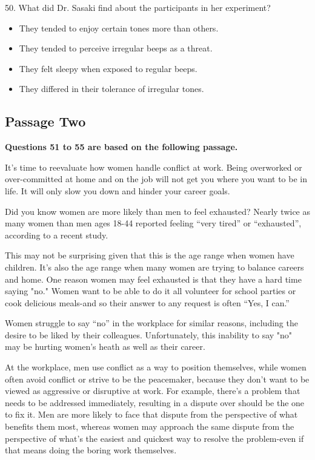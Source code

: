 \documentclass[UTF8,11pt]{ctexart}
\begin{document}
50. What did Dr. Sasaki find about the participants in her experiment?


\begin{itemize}[leftmargin=2em,itemsep=.2em,topsep=.4em]\item[A.] They tended to enjoy certain tones more than others.
\item[B.] They tended to perceive irregular beeps as a threat.
\item[C.] They felt sleepy when exposed to regular beeps.
\item[D.] They differed in their tolerance of irregular tones.
\end{itemize}

\subsection*{\textbf{Passage Two}}


\textbf{Questions 51 to 55 are based on the following passage.}


It’s time to reevaluate how women handle conflict at work. Being overworked or over-committed at home and on the job will not get you where you want to be in life. It will only slow you down and hinder your career goals.


Did you know women are more likely than men to feel exhausted? Nearly twice as many women than men ages 18-44 reported feeling “very tired” or “exhausted”, according to a recent study.


This may not be surprising given that this is the age range when women have children. It's also the age range when many women are trying to balance careers and home. One reason women may feel exhausted is that they have a hard time saying "no." Women want to be able to do it all volunteer for school parties or cook delicious meals-and so their answer to any request is often “Yes, I can.”


Women struggle to say “no” in the workplace for similar reasons, including the desire to be liked by their colleagues. Unfortunately, this inability to say "no" may be hurting women's heath as well as their career.


At the workplace, men use conflict as a way to position themselves, while women often avoid conflict or strive to be the peacemaker, because they don't want to be viewed as aggressive or disruptive at work. For example, there’s a problem that needs to be addressed immediately, resulting in a dispute over should be the one to fix it. Men are more likely to face that dispute from the perspective of what benefits them most, whereas women may approach the same dispute from the perspective of what's the easiest and quickest way to resolve the problem-even if that means doing the boring work themselves.
\end{document}
